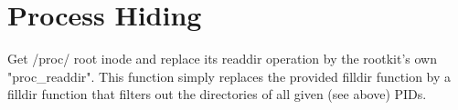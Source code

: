 \section{Process Hiding}
Get /proc/ root inode and replace its readdir operation by the rootkit's own
"proc_readdir". This function simply replaces the provided filldir function 
by a filldir function that filters out the directories of all given (see 
above) PIDs. 